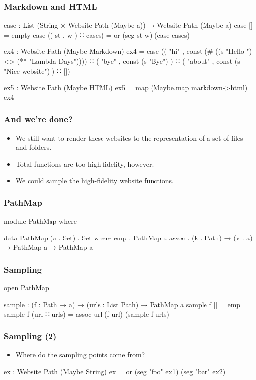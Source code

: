 \documentclass[aspectratio=169]{beamer}
\begin{document}
\begin{frame}
\frametitle{Markdown and HTML}
\begin{code}
  case : List (String × Website Path (Maybe a)) → Website Path (Maybe a)
  case [] = empty
  case (( st , w ) ∷ cases) = or (seg st w) (case cases)
  
  ex4 : Website Path (Maybe Markdown)
  ex4 = case (( "hi" , const (# ((s "Hello ") <> (** "Lambda Days")))) ∷
              ( "bye" , const (s "Bye") ) ∷
              ( "about" , const (s "Nice website") ) ∷
              [])
  
  ex5 : Website Path (Maybe HTML)
  ex5 = map (Maybe.map markdown->html) ex4
\end{code}
\end{frame}

\begin{frame}
\frametitle{And we're done?}
\begin{itemize}
 \item We still want to render these websites to the representation of a set of files and folders.
 \item Total functions are too high fidelity, however.
 \item We could sample the high-fidelity website functions.
\end{itemize}
\end{frame}

\begin{frame}
\frametitle{PathMap}
\begin{code}
  module PathMap where
  
    data PathMap (a : Set) : Set where
      emp : PathMap a
      assoc : (k : Path) → (v : a) → PathMap a → PathMap a
\end{code}
\end{frame}

\begin{frame}
\frametitle{Sampling}
\begin{code}
  open PathMap

  sample : (f : Path → a) → (urls : List Path) → PathMap a
  sample f [] = emp
  sample f (url ∷ urls) = assoc url (f url) (sample f urls)
\end{code}
\end{frame}

\begin{frame}
\frametitle{Sampling (2)}
\begin{itemize}
  \item Where do the sampling points come from?
\end{itemize}
\begin{code}
  ex : Website Path (Maybe String)
  ex = or (seg "foo" ex1)
          (seg "bar" ex2)
\end{code}
\end{frame}
\end{document}
